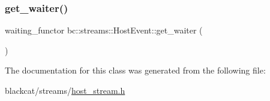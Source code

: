 \subsubsection{\texorpdfstring{get\+\_\+waiter()}{get\_waiter()}}
{\footnotesize\ttfamily waiting\+\_\+functor bc\+::streams\+::\+Host\+Event\+::get\+\_\+waiter (\begin{DoxyParamCaption}{ }\end{DoxyParamCaption})\hspace{0.3cm}{\ttfamily [inline]}}



The documentation for this class was generated from the following file\+:\begin{DoxyCompactItemize}
\item 
blackcat/streams/\hyperlink{host__stream_8h}{host\+\_\+stream.\+h}\end{DoxyCompactItemize}
